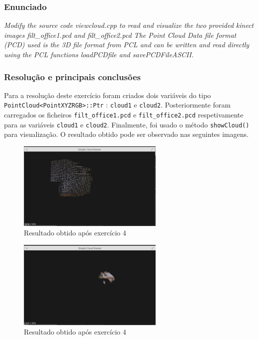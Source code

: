 \documentclass[portuguese, times, mirror]{revdetua}
\begin{document}
\subsubsection{Enunciado}
\textit{Modify the source code viewcloud.cpp to read and visualize the two provided kinect images 
filt\_office1.pcd and filt\_office2.pcd The Point Cloud Data file format (PCD) used is the 3D file
format from PCL and can be written and read directly using the PCL functions loadPCDfile and 
savePCDFileASCII. }


\subsubsection{Resolução e principais conclusões}

Para a resolução deste exercício foram criados dois variáveis do tipo \texttt{PointCloud<PointXYZRGB>::Ptr} : \texttt{cloud1} e \texttt{cloud2}. 
Posteriormente foram carregados os ficheiros \texttt{filt\_office1.pcd} e \texttt{filt\_office2.pcd} respetivamente para as variáveis \texttt{cloud1} e \texttt{cloud2}. Finalmente, foi usado o método \texttt{showCloud()} para visualização. O resultado obtido pode ser observado nas seguintes imagens. 

\begin{figure}[ht!]
\centering
\includegraphics[width=70mm]{img/ex4_1.png}
\caption{Resultado obtido após exercício 4}
\end{figure}


\begin{figure}[ht!]
\centering
\includegraphics[width=70mm]{img/ex4_2.png}
\caption{Resultado obtido após exercício 4}
\end{figure}
\end{document}
